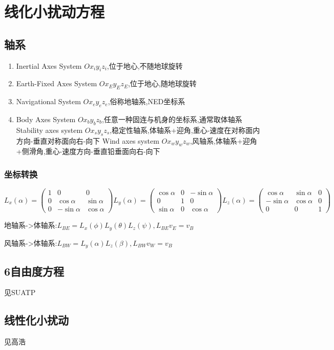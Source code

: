 \chapter{线化小扰动方程}
\section{轴系}
\begin{enumerate}[label=\arabic*.,topsep=0pt]
\setlength{\itemsep}{-2pt}
\item Inertial Axes System $Ox_iy_iz_i$,位于地心,不随地球旋转
\item Earth-Fixed Axes System $Ox_Ey_Ez_E$,位于地心,随地球旋转
\item Navigational System $Ox_ey_ez_e$,俗称地轴系,NED坐标系
\item Body Axes System $Ox_by_bz_b$,任意一种固连与机身的坐标系,通常取体轴系
\subitem Stability axes system $Ox_sy_sz_s$,稳定性轴系,体轴系+迎角,重心-速度在对称面内方向-垂直对称面向右-向下
\subitem Wind axes system $Ox_wy_wz_w$,风轴系,体轴系+迎角+侧滑角,重心-速度方向-垂直铅垂面向右-向下

\end{enumerate}

\subsection{坐标转换}
$$
L_x(\alpha)=
\begin{pmatrix}
1&0&0\\
0&\cos\alpha&\sin\alpha\\
0&-\sin\alpha&\cos\alpha
\end{pmatrix}
L_y(\alpha)=
\begin{pmatrix}
\cos\alpha&0&-\sin\alpha\\
0&1&0\\
\sin\alpha&0&\cos\alpha
\end{pmatrix}
L_z(\alpha)=
\begin{pmatrix}
\cos\alpha&\sin\alpha&0\\
-\sin\alpha&\cos\alpha&0\\
0&0&1
\end{pmatrix}
$$

地轴系->体轴系:$L_{BE}=L_x(\phi)L_y(\theta)L_z(\psi),L_{BE}v_E=v_B$

风轴系->体轴系:$L_{BW}=L_y(\alpha)L_z(\beta),L_{BW}v_W=v_B$

\section{6自由度方程}
见SUATP

\section{线性化小扰动}
见高浩
\endinput